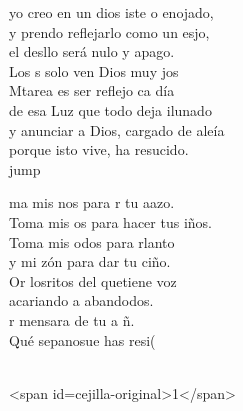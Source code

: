 \begin{cancion}%
	 yo creo en un dios iste o enojado,\\
	y prendo reflejarlo como un esjo,\\
	el desllo será nulo y apago.\\
	Los s solo ven Dios muy jos  \\
	Mtarea es ser reflejo ca día\\
	de esa Luz que todo deja ilunado\\
	y anunciar a Dios, cargado de aleía\\
	porque isto vive, ha resucido.\\jump\\
	\begin{chorus}%
	ma mis nos para r tu aazo.\\
	Toma mis os para hacer tus iños.\\
	Toma mis odos para rlanto\\
	y mi zón para dar tu ciño.\\
	Or losritos del quetiene voz\\
	acariando a abandodos.\\
	r mensara de tu a ñ. \\
	Qué sepanosue has resi(\\
	\end{chorus}%
	\jump\\
<span id=cejilla-original>1</span>\\
\end{cancion}%
